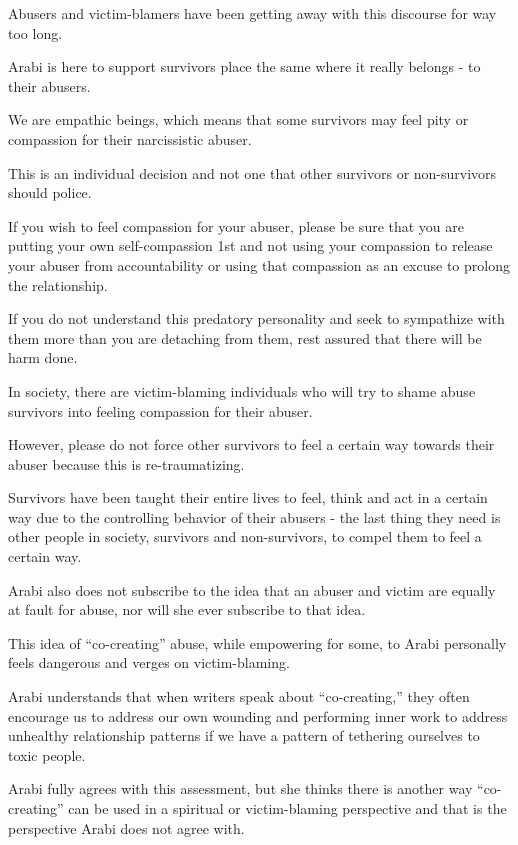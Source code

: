 \documentclass[oneside]{book}
\numberwithin{equation}{section}
\begin{document}
Abusers and victim-blamers have been getting away with this discourse for way too long.

Arabi is here to support survivors place the same where it really belongs - to their abusers.

%
We are empathic beings, which means that some survivors may feel pity or compassion for their narcissistic abuser.

This is an individual decision and not one that other survivors or non-survivors should police.

If you wish to feel compassion for your abuser, please be sure that you are putting your own self-compassion 1st and not using your compassion to release your abuser from accountability or using that compassion as an excuse to prolong the relationship.

If you do not understand this predatory personality and seek to sympathize with them more than you are detaching from them, rest assured that there will be harm done.


%
In society, there are victim-blaming individuals who will try to shame abuse survivors into feeling compassion for their abuser.


However, please do not force other survivors to feel a certain way towards their abuser because this is re-traumatizing.

Survivors have been taught their entire lives to feel, think and act in a certain way due to the controlling behavior of their abusers - the last thing they need is other people in society, survivors and non-survivors, to compel them to feel a certain way.

%
Arabi also does not subscribe to the idea that an abuser and victim are equally at fault for abuse, nor will she ever subscribe to that idea.

This idea of ``co-creating'' abuse, while empowering for some, to Arabi personally feels dangerous and verges on victim-blaming.

Arabi understands that when writers speak about ``co-creating,'' they often encourage us to address our own wounding and performing inner work to address unhealthy relationship patterns if we have a pattern of tethering ourselves to toxic people.

Arabi fully agrees with this assessment, but she thinks there is another way ``co-creating'' can be used in a spiritual or victim-blaming perspective and that is the perspective Arabi does not agree with.
\end{document}
